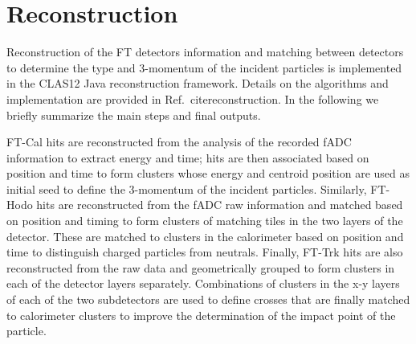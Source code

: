 \section{Reconstruction}
Reconstruction of the FT detectors information and matching between detectors to determine the type and 3-momentum of the incident particles is implemented in the CLAS12 Java reconstruction framework. Details on the algorithms and implementation are provided in Ref.~cite{reconstruction}. In the following we briefly summarize the main steps and final outputs.

FT-Cal hits are reconstructed from the analysis of the recorded fADC information to extract energy and time; hits are then associated based on position and time to form clusters whose energy and centroid position are used as initial seed to define the 3-momentum of the incident particles. Similarly, FT-Hodo hits are reconstructed from the fADC raw information and matched based on position and timing to form clusters of matching tiles in the two layers of the detector. These are matched to clusters in the calorimeter based on position and time to distinguish charged particles from neutrals. Finally, FT-Trk hits are also reconstructed from the raw data and geometrically grouped to form clusters in each of the detector layers separately. Combinations of clusters in the x-y layers of each of the two subdetectors are used to define crosses that are finally matched to calorimeter clusters to improve the determination of the impact point of the particle.

